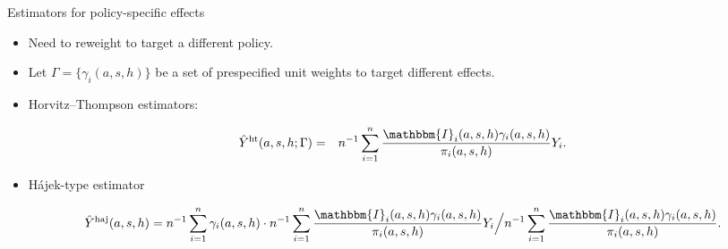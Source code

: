 \documentclass[aspectratio=169]{beamer}
\newcommand{\sumi}{\sum_{i=1}^n}
\newcommand{\horthom}{\textup{ht}}
\newcommand{\haj}{\textup{haj}}
\newcommand{\bbI}{\mathbbm{I}}
\newcommand{\pscore}[1]{\pi_{#1}}
\begin{document}
\begin{frame}{Estimators for policy-specific effects}
\begin{itemize}
    \item Need to reweight to target a different policy. 
    \pause 
    
    \item Let $\Gamma = \{\gamma_i(a,s,h)\}$ be a set of prespecified unit weights to target different effects. 
    \pause
    
    \item Horvitz--Thompson estimators:
    \begin{small}
    \begin{eqnarray*}
        \hat{Y}^{\horthom}(a,s,h;\Gamma) &=& n^{-1}\sumi\frac{ \bbI_{i}(a,s,h)\gamma_i(a,s,h)}{ \pscore{i}(a,s,h)}Y_{i}. 
    \end{eqnarray*}
    \end{small}
    \pause
    
    \item H\'{a}jek-type estimator
    \begin{small}
    \begin{equation*}
    \hat{Y}^{\haj}(a,s,h) = n^{-1}\sumi \gamma_i(a,s,h)\cdot n^{-1}\sumi\frac{ \bbI_{i}(a,s,h) \gamma_i(a,s,h)}{ \pscore{i}(a,s,h)}Y_{i} \Big / n^{-1}\sumi\frac{ \bbI_{i}(a,s,h) \gamma_i(a,s,h)}{ \pscore{i}(a,s,h)}. 
    \end{equation*}
    \end{small} 
\end{itemize}
\end{frame}
\end{document}
